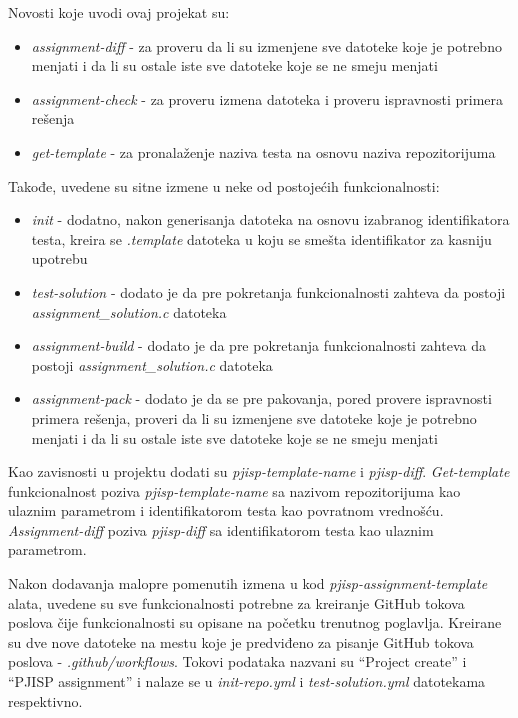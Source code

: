 \documentclass[12pt]{report}
\begin{document}
Novosti koje uvodi ovaj projekat su:

\begin{itemize}
    \item \textit{assignment-diff} - za proveru da li su izmenjene sve datoteke koje je potrebno menjati i da li su ostale iste sve datoteke koje se ne smeju menjati
    \item \textit{assignment-check} - za proveru izmena datoteka i proveru ispravnosti primera rešenja
    \item \textit{get-template} - za pronalaženje naziva testa na osnovu naziva repozitorijuma
\end{itemize}

Takođe, uvedene su sitne izmene u neke od postojećih funkcionalnosti:

\begin{itemize}
    \item \textit{init} - dodatno, nakon generisanja datoteka na osnovu izabranog identifikatora testa, kreira se \textit{.template} datoteka u koju se smešta identifikator za kasniju upotrebu
    \item \textit{test-solution} - dodato je da pre pokretanja funkcionalnosti zahteva da postoji \textit{assignment\_solution.c} datoteka
    \item \textit{assignment-build} - dodato je da pre pokretanja funkcionalnosti zahteva da postoji \textit{assignment\_solution.c} datoteka
    \item \textit{assignment-pack} - dodato je da se pre pakovanja, pored provere ispravnosti primera rešenja, proveri da li su izmenjene sve datoteke koje je potrebno menjati i da li su ostale iste sve datoteke koje se ne smeju menjati
\end{itemize}

Kao zavisnosti u projektu dodati su \textit{pjisp-template-name} i \textit{pjisp-diff}. \textit{Get-template} funkcionalnost poziva \textit{pjisp-template-name} sa nazivom repozitorijuma kao ulaznim parametrom i identifikatorom testa kao povratnom vrednošću. \textit{Assignment-diff} poziva \textit{pjisp-diff} sa identifikatorom testa kao ulaznim parametrom.

Nakon dodavanja malopre pomenutih izmena u kod \textit{pjisp-assignment-template} alata, uvedene su sve funkcionalnosti potrebne za kreiranje GitHub tokova poslova čije funkcionalnosti su opisane na početku trenutnog poglavlja. Kreirane su dve nove datoteke na mestu koje je predviđeno za pisanje GitHub tokova poslova - \textit{.github/workflows}. Tokovi podataka nazvani su ``Project create'' i ``PJISP assignment'' i nalaze se u \textit{init-repo.yml} i \textit{test-solution.yml} datotekama respektivno.
\end{document}
